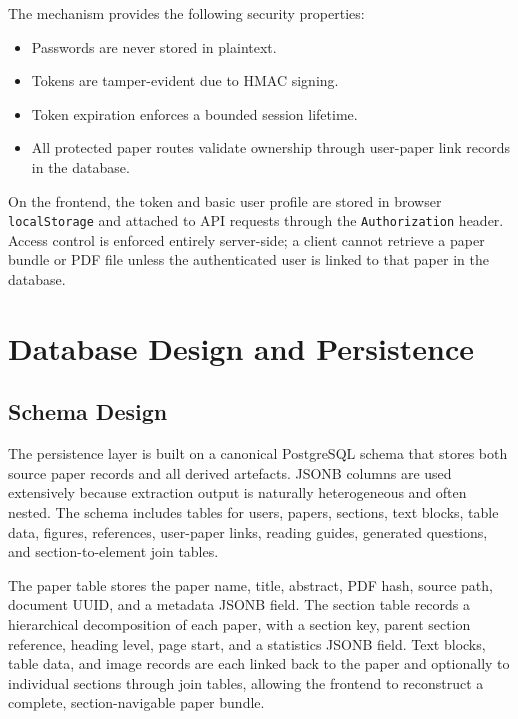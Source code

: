 \documentclass[12pt,a4paper]{report}
\begin{document}
The mechanism provides the following security properties:

\begin{itemize}
    \item Passwords are never stored in plaintext.
    \item Tokens are tamper-evident due to HMAC signing.
    \item Token expiration enforces a bounded session lifetime.
    \item All protected paper routes validate ownership through user-paper link
    records in the database.
\end{itemize}

On the frontend, the token and basic user profile are stored in browser
\texttt{localStorage} and attached to API requests through the
\texttt{Authorization} header. Access control is enforced entirely server-side;
a client cannot retrieve a paper bundle or PDF file unless the authenticated
user is linked to that paper in the database.

\section{Database Design and Persistence}

\subsection{Schema Design}

The persistence layer is built on a canonical PostgreSQL schema that stores both
source paper records and all derived artefacts. JSONB columns are used
extensively because extraction output is naturally heterogeneous and often
nested. The schema includes tables for users, papers, sections, text blocks,
table data, figures, references, user-paper links, reading guides, generated
questions, and section-to-element join tables.

The paper table stores the paper name, title, abstract, PDF hash, source path,
document UUID, and a metadata JSONB field. The section table records a
hierarchical decomposition of each paper, with a section key, parent section
reference, heading level, page start, and a statistics JSONB field. Text
blocks, table data, and image records are each linked back to the paper and
optionally to individual sections through join tables, allowing the frontend to
reconstruct a complete, section-navigable paper bundle.
\end{document}
